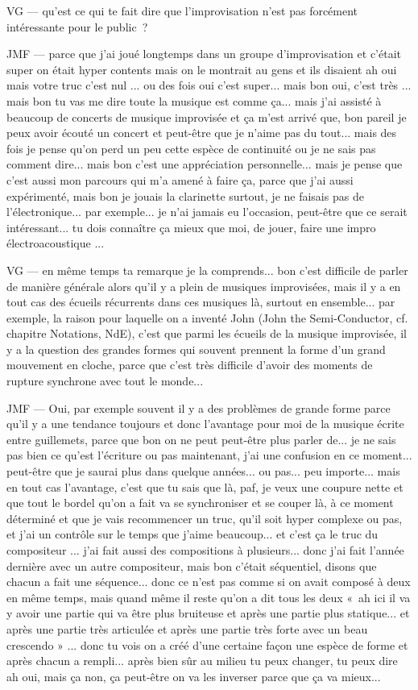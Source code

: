 VG — qu'est ce qui te fait dire que l'improvisation n'est pas forcément intéressante pour le public ? 

JMF — parce que j'ai joué longtemps dans un groupe d'improvisation et c'était super on était hyper contents mais on le montrait au gens et ils disaient ah oui mais votre truc c'est nul ... ou des fois oui c'est super... mais bon oui, c'est très ... mais bon tu vas me dire toute la musique est comme ça... mais j'ai assisté à beaucoup de concerts de musique improvisée et ça m'est arrivé que, bon pareil je peux avoir écouté un concert et peut-être que je n'aime pas du tout... mais des fois je pense qu'on perd un peu cette espèce de continuité ou je ne sais pas comment dire... mais bon c'est une appréciation personnelle... mais je pense que c'est aussi mon parcours qui m'a amené à faire ça, parce que j'ai aussi expérimenté, mais bon je jouais la clarinette surtout, je ne faisais pas de l'électronique... par exemple... je n'ai jamais eu l'occasion, peut-être que ce serait intéressant... tu dois connaître ça mieux que moi, de jouer, faire une impro électroacoustique ... 

VG — en même temps ta remarque je la comprends... bon c'est difficile de parler de manière générale alors qu'il y a plein de musiques improvisées, mais il y a en tout cas des écueils récurrents dans ces musiques là, surtout en ensemble... par exemple, la raison pour laquelle on a inventé John (John the Semi-Conductor, cf. chapitre Notations, NdE), c'est que parmi les écueils de la musique improvisée, il y a la question des grandes formes qui souvent prennent la forme d'un grand mouvement en cloche, parce que c'est très difficile d'avoir des moments de rupture synchrone avec tout le monde...  

JMF — Oui, par exemple souvent il y a des problèmes de grande forme parce qu'il y a une tendance toujours et donc l'avantage pour moi de la musique écrite entre guillemets, parce que bon on ne peut peut-être plus parler de... je ne sais pas bien ce qu'est l'écriture ou pas maintenant, j'ai une confusion en ce moment... peut-être que je saurai plus dans quelque années... ou pas... peu importe... mais en tout cas l'avantage, c'est que tu sais que là, paf, je veux une coupure nette et que tout le bordel qu'on a fait va se synchroniser et se couper là, à ce moment déterminé et que je vais recommencer un truc, qu'il soit hyper complexe ou pas, et j'ai un contrôle sur le temps que j'aime beaucoup... et c'est ça le truc du compositeur ... j'ai fait aussi des compositions à plusieurs... donc j'ai fait l'année dernière avec un autre compositeur, mais bon c'était séquentiel, disons que chacun a fait une séquence... donc ce n'est pas comme si on avait composé à deux en même temps, mais quand même il reste qu'on a dit tous les deux « ah ici il va y avoir une partie qui va être plus bruiteuse et après une partie plus statique... et après une partie très articulée et après une partie très forte avec un beau crescendo » ... donc tu vois on a créé d'une certaine façon une espèce de forme et après chacun a rempli... après bien sûr au milieu tu peux changer, tu peux dire ah oui, mais ça non, ça peut-être on va les inverser parce que ça va mieux... 

